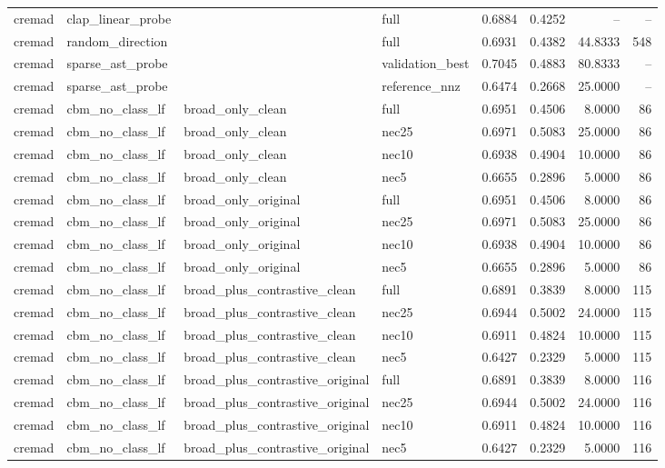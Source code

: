 \begin{table}[t]
\begin{tabular}{llllrrrr}
cremad & clap\_linear\_probe &  & full & 0.6884 & 0.4252 & -- & -- \\
cremad & random\_direction &  & full & 0.6931 & 0.4382 & 44.8333 & 548 \\
cremad & sparse\_ast\_probe &  & validation\_best & 0.7045 & 0.4883 & 80.8333 & -- \\
cremad & sparse\_ast\_probe &  & reference\_nnz & 0.6474 & 0.2668 & 25.0000 & -- \\
cremad & cbm\_no\_class\_lf & broad\_only\_clean & full & 0.6951 & 0.4506 & 8.0000 & 86 \\
cremad & cbm\_no\_class\_lf & broad\_only\_clean & nec25 & 0.6971 & 0.5083 & 25.0000 & 86 \\
cremad & cbm\_no\_class\_lf & broad\_only\_clean & nec10 & 0.6938 & 0.4904 & 10.0000 & 86 \\
cremad & cbm\_no\_class\_lf & broad\_only\_clean & nec5 & 0.6655 & 0.2896 & 5.0000 & 86 \\
cremad & cbm\_no\_class\_lf & broad\_only\_original & full & 0.6951 & 0.4506 & 8.0000 & 86 \\
cremad & cbm\_no\_class\_lf & broad\_only\_original & nec25 & 0.6971 & 0.5083 & 25.0000 & 86 \\
cremad & cbm\_no\_class\_lf & broad\_only\_original & nec10 & 0.6938 & 0.4904 & 10.0000 & 86 \\
cremad & cbm\_no\_class\_lf & broad\_only\_original & nec5 & 0.6655 & 0.2896 & 5.0000 & 86 \\
cremad & cbm\_no\_class\_lf & broad\_plus\_contrastive\_clean & full & 0.6891 & 0.3839 & 8.0000 & 115 \\
cremad & cbm\_no\_class\_lf & broad\_plus\_contrastive\_clean & nec25 & 0.6944 & 0.5002 & 24.0000 & 115 \\
cremad & cbm\_no\_class\_lf & broad\_plus\_contrastive\_clean & nec10 & 0.6911 & 0.4824 & 10.0000 & 115 \\
cremad & cbm\_no\_class\_lf & broad\_plus\_contrastive\_clean & nec5 & 0.6427 & 0.2329 & 5.0000 & 115 \\
cremad & cbm\_no\_class\_lf & broad\_plus\_contrastive\_original & full & 0.6891 & 0.3839 & 8.0000 & 116 \\
cremad & cbm\_no\_class\_lf & broad\_plus\_contrastive\_original & nec25 & 0.6944 & 0.5002 & 24.0000 & 116 \\
cremad & cbm\_no\_class\_lf & broad\_plus\_contrastive\_original & nec10 & 0.6911 & 0.4824 & 10.0000 & 116 \\
cremad & cbm\_no\_class\_lf & broad\_plus\_contrastive\_original & nec5 & 0.6427 & 0.2329 & 5.0000 & 116 \\

\end{tabular}
\end{table}
